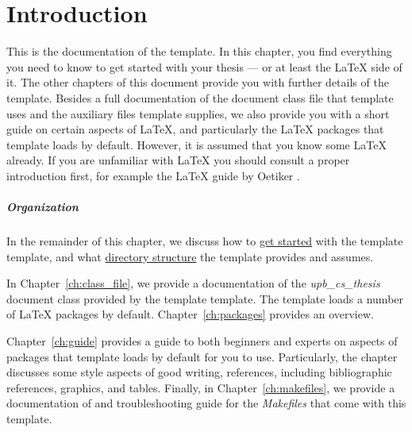 \chapter{Introduction}
\label{ch:introduction}

This is the documentation of the \ac{template}.
In this chapter, you find everything you need to know to get started with your
thesis --- or at least the \LaTeX{} side of it. 
The other chapters of this document provide you with further details of the
template.
Besides a full documentation of the document class file that \ac{template}
uses and the auxiliary files \ac{template} supplies, we also provide you with
a short guide on certain aspects of \LaTeX{}, and particularly the \LaTeX{}
packages that \ac{template} loads by default.
However, it is assumed that you know some \LaTeX{} already.
If you are unfamiliar with \LaTeX{} you should consult a proper introduction
first, for example the \LaTeX{} guide by Oetiker \etal{} \cite{LatexGuide}.


\paragraph{Organization}
In the remainder of this chapter, we discuss how to
\hyperref[sec:introduction:start]{get started} with the \ac{template} template,
and what \hyperref[sec:introduction:folders]{directory structure} the template
provides and assumes.

In Chapter~\ref{ch:class_file}, we provide a documentation of the
\emph{upb\_cs\_thesis} document class provided by the \ac{template} template.
The template loads a number of \LaTeX{} packages by default.
Chapter~\ref{ch:packages} provides an overview.

Chapter~\ref{ch:guide} provides a guide to both beginners and experts on
aspects of packages that \ac{template} loads by default for you to use.
Particularly, the chapter discusses some style aspects of good writing,
references, including bibliographic references, graphics, and tables.
Finally, in Chapter~\ref{ch:makefiles}, we provide a documentation of and
troubleshooting guide for the \emph{Makefiles} that come with this template.

